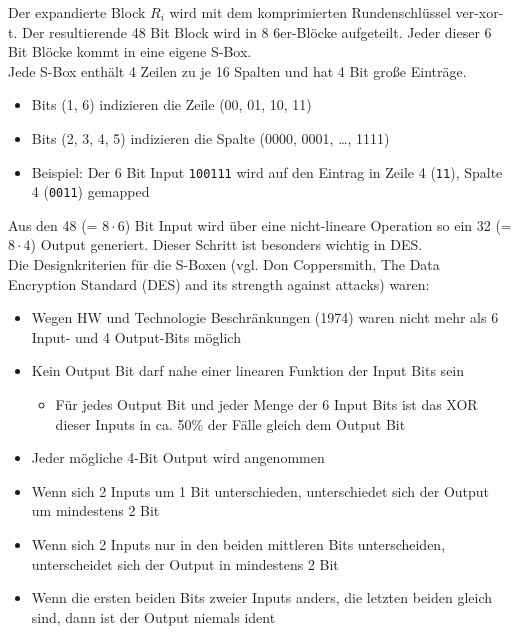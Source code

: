 Der expandierte Block $R_i$ wird mit dem komprimierten Rundenschlüssel ver-xor-t. Der resultierende 48 Bit Block wird in 8 6er-Blöcke aufgeteilt. Jeder dieser 6 Bit 
Blöcke kommt in eine eigene S-Box. \\

Jede S-Box enthält 4 Zeilen zu je 16 Spalten und hat 4 Bit große Einträge.

\begin{itemize}
    \item Bits (1, 6) indizieren die Zeile (00, 01, 10, 11)
    \item Bits (2, 3, 4, 5) indizieren die Spalte (0000, 0001, \ldots, 1111)
    \item Beispiel: Der 6 Bit Input \verb|100111| wird auf den Eintrag in Zeile 4 (\verb|11|), Spalte 4 (\verb|0011|) gemapped
\end{itemize}

Aus den 48 (= $8 \cdot 6$) Bit Input wird über eine nicht-lineare Operation so ein 32 (= $8 \cdot 4$) Output generiert. Dieser Schritt ist besonders wichtig in DES. \\

Die Designkriterien für die S-Boxen (vgl. Don Coppersmith, The Data Encryption Standard (DES) and its strength against attacks) waren: 
\begin{itemize}
    \item Wegen HW und Technologie Beschränkungen (1974) waren nicht mehr als 6 Input- und 4 Output-Bits möglich 
    \item Kein Output Bit darf nahe einer linearen Funktion der Input Bits sein 
    \begin{itemize}
        \item Für jedes Output Bit und jeder Menge der 6 Input Bits ist das XOR dieser Inputs in ca. 50\% der Fälle gleich dem Output Bit
    \end{itemize}
    \item Jeder mögliche 4-Bit Output wird angenommen
    \item Wenn sich 2 Inputs um 1 Bit unterschieden, unterschiedet sich der Output um mindestens 2 Bit
    \item Wenn sich 2 Inputs nur in den beiden mittleren Bits unterscheiden, unterscheidet sich der Output in mindestens 2 Bit
    \item Wenn die ersten beiden Bits zweier Inputs anders, die letzten beiden gleich sind, dann ist der Output niemals ident
\end{itemize}

